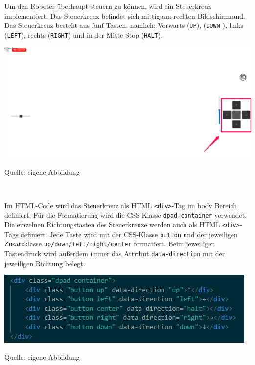 \documentclass[ngerman,12pt,a4paper]{article}
\begin{document}
	Um den Roboter überhaupt steuern zu können, wird ein Steuerkreuz implementiert. Das Steuerkreuz befindet sich mittig am rechten Bildschirmrand. Das Steuerkreuz besteht aus fünf Tasten, nämlich: Vorwarts (\texttt{UP}), (\texttt{DOWN} ), links (\texttt{LEFT}), rechts (\texttt{RIGHT}) und in der Mitte Stop (\texttt{HALT}). \\[0.5cm]
	\begin{center}
		\begin{minipage}[t]{1\textwidth}
			\includegraphics[scale=0.4]{Pictures/Steuerung-web}
			\label{fig:Steuerkreuz-web}
			\vspace{-10pt}
			\begin{center}
				\par\small Quelle: eigene Abbildung 
			\end{center}
		\end{minipage} \\[0.75cm]
	\end{center}
	Im HTML-Code wird das Steuerkreuz als HTML \texttt{<div>}-Tag im body Bereich definiert. Für die Formatierung wird die CSS-Klasse \texttt{dpad-container} verwendet. Die einzelnen Richtungstasten des Steuerkreuze werden auch als HTML \texttt{<div>}-Tags definiert. Jede Taste wird mit der CSS-Klasse \texttt{button} und der jeweiligen Zusatzklasse \texttt{up/down/left/right/center} formatiert. Beim jeweiligen Tastendruck wird außerdem immer das Attribut \texttt{data-direction} mit der jeweiligen Richtung belegt.
	\begin{center}
		\begin{minipage}[t]{0.65\textwidth}
			\includegraphics[scale=0.8]{Pictures/Steuerung-html}
			\label{fig:Steuerkreuz-html}
			\vspace{-10pt}
			\begin{center}
				\par\small Quelle: eigene Abbildung 
			\end{center}
		\end{minipage} \\[0.75cm]
	\end{center}
\end{document}
